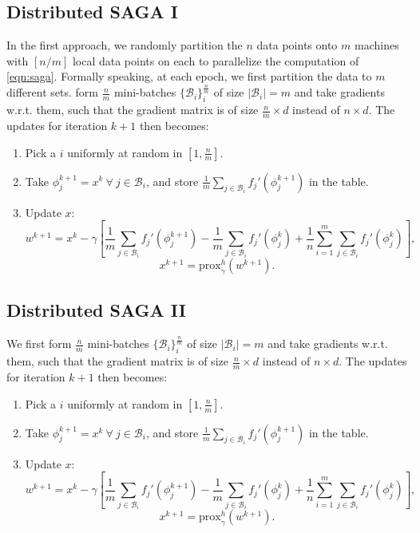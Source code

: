 \documentclass[a4paper,11pt]{article}
\newcommand{\B}{\mathcal{B}}
\newcommand{\prox}{\textrm{prox}}
\begin{document}
\subsection{Distributed SAGA I}
In the first approach, we randomly partition the $n$ data points onto $m$ machines with $[n/m]$ local data points on each to parallelize the computation of \eqref{eqn:saga}. Formally speaking, at each epoch, we first partition the data to $m$ different sets. 
form $\frac{n}m$ mini-batches $\{\B_i\}_i^{\frac{n}m}$ of size $|\B_i|
= m$ and take gradients w.r.t. them, such that the gradient matrix is of size
$\frac{n}m \times d$ instead of $n \times d$. The updates for iteration $k+1$
then becomes:
\begin{enumerate}
	\item Pick a $i$ uniformly at random in $[1, \frac{n}m]$.
	\item Take $\phi_j^{k+1} = x^k \ \forall \ j \in \B_i$, and store $\frac1m
	\sum_{j\in\B_i} f_j'(\phi_j^{k+1})$ in the table.
	\item Update $x$:
	\begin{equation} \label{eqn:distsaga1}
	w^{k+1} = x^k - \gamma \left[ \frac1m \sum_{j\in\B_i} f_j'(\phi_j^{k+1})
	- \frac1m \sum_{j\in\B_i} f_j'(\phi_j^k)
	+ \frac1n \sum_{i=1}^m \sum_{j\in\B_i} f_j'(\phi_j^k) \right] ,
	\end{equation}
	$$x^{k+1} = \prox_\gamma^h (w^{k+1}).$$
\end{enumerate}

\subsection{Distributed SAGA II}

We first form $\frac{n}m$ mini-batches $\{\B_i\}_i^{\frac{n}m}$ of size $|\B_i|
= m$ and take gradients w.r.t. them, such that the gradient matrix is of size
$\frac{n}m \times d$ instead of $n \times d$. The updates for iteration $k+1$
then becomes:
\begin{enumerate}
	\item Pick a $i$ uniformly at random in $[1, \frac{n}m]$.
	\item Take $\phi_j^{k+1} = x^k \ \forall \ j \in \B_i$, and store $\frac1m
	\sum_{j\in\B_i} f_j'(\phi_j^{k+1})$ in the table.
	\item Update $x$:
	\begin{equation} \label{eqn:distsaga2}
	w^{k+1} = x^k - \gamma \left[ \frac1m \sum_{j\in\B_i} f_j'(\phi_j^{k+1})
	- \frac1m \sum_{j\in\B_i} f_j'(\phi_j^k)
	+ \frac1n \sum_{i=1}^m \sum_{j\in\B_i} f_j'(\phi_j^k) \right] ,
	\end{equation}
	$$x^{k+1} = \prox_\gamma^h (w^{k+1}).$$
\end{enumerate}
\end{document}
